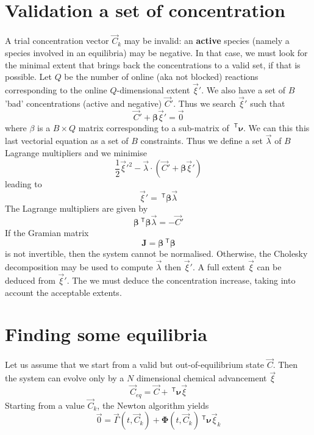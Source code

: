 \documentclass[aps]{revtex4}
\newcommand{\mymat}[1]{\bm{#1}}
\newcommand{\mytrn}[1]{~^{\mathsf{T}}{#1}}
\begin{document}
\section{Validation a set of concentration}
A trial concentration vector $\vec{C}_k$ may be invalid: an \textbf{active} species (namely a species involved in an equilibria)
may be negative. In that case, we must look for the minimal extent that brings back the concentrations to a valid set, if that
is possible.
Let $Q$ be the number of online (aka not blocked) reactions corresponding 
to the online $Q$-dimensional extent $\vec{\xi}'$. We also have a set of $B$ 'bad' concentrations (active and negative) $\vec{C}'$.
Thus we search $\vec{\xi}'$ such that
$$
	\vec{C}' + \mymat{\beta} \vec{\xi}' = \vec{0}
$$
where $\beta$ is a $B\times Q$ matrix corresponding to a sub-matrix of $\mytrn{\mymat{\nu}}$.
We can this this last vectorial equation as a set of $B$ constraints. Thus we define a set
$\vec{\lambda}$ of $B$ Lagrange multipliers and we minimise
$$
	\dfrac{1}{2} \vec{\xi}'^2 - \vec{\lambda}\cdot\left(\vec{C}' + \mymat{\beta} \vec{\xi}'\right)
$$
leading to
$$
	\vec{\xi}' = \mytrn{\mymat{\beta}}\vec{\lambda}
$$
The Lagrange multipliers are given by
$$
	\mymat{\beta}\mytrn{\mymat{\beta}} \vec{\lambda} = -\vec{C}'
$$
If the Gramian matrix 
$$
	\mymat{J} = \mymat{\beta}\mytrn{\mymat{\beta}}
$$	
is not invertible, then the system cannot be normalised.
Otherwise, the Cholesky decomposition may be used to compute $\vec{\lambda}$ then 
$\vec{\xi}'$.
A full extent $\vec{\xi}$ can be deduced from $\vec{\xi}'$.
The we must deduce the concentration increase, taking into account the acceptable extents.





\section{Finding some equilibria}

Let us assume that we start from a valid but out-of-equilibrium state $\vec{C}$.
Then the system can evolve only by a $N$ dimensional chemical advancement $\vec{\xi}$
\begin{equation}
	\vec{C}_{eq} = \vec{C} + \mytrn{\mymat{\nu}}\vec{\xi}
\end{equation}
Starting from a value $\vec{C}_{k}$, the Newton algorithm yields
\begin{equation}
	\vec{0} = \vec{\Gamma}(t,\vec{C}_k) + \mymat{\Phi}(t,\vec{C}_k) \mytrn{\mymat{\nu}}\vec{\xi}_k
\end{equation}
\end{document}
